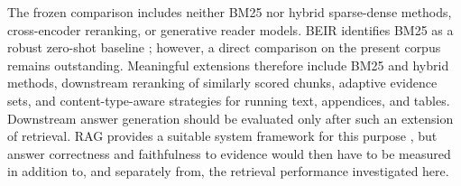 \documentclass[11pt]{article}
\begin{document}
The frozen comparison includes neither BM25 nor hybrid sparse-dense methods, cross-encoder reranking, or generative reader models. BEIR identifies BM25 as a robust zero-shot baseline \citep{thakur2021beir}; however, a direct comparison on the present corpus remains outstanding. Meaningful extensions therefore include BM25 and hybrid methods, downstream reranking of similarly scored chunks, adaptive evidence sets, and content-type-aware strategies for running text, appendices, and tables. Downstream answer generation should be evaluated only after such an extension of retrieval. RAG provides a suitable system framework for this purpose \citep{lewis2020rag}, but answer correctness and faithfulness to evidence would then have to be measured in addition to, and separately from, the retrieval performance investigated here.


\end{document}
